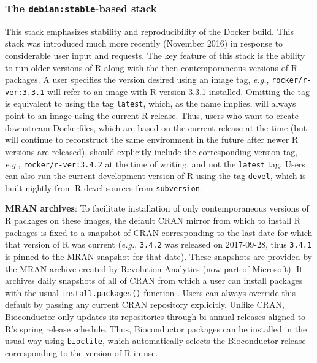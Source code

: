 \subsubsection{\texorpdfstring{The \texttt{debian:stable}-based
stack}{The debian:stable-based stack}}\label{the-debianstable-based-stack}

This stack emphasizes stability and reproducibility of the Docker build.
This stack was introduced much more recently (November 2016) in response
to considerable user input and requests. The key feature of this stack
is the ability to run older versions of R along with the
then-contemporaneous versions of R packages. A user specifies the
version desired using an image tag, \emph{e.g.},
\texttt{rocker/r-ver:3.3.1} will refer to an image with R version 3.3.1
installed. Omitting the tag is equivalent to using the tag
\texttt{latest}, which, as the name implies, will always point to an
image using the current R release. Thus, users who want to create
downstream Dockerfiles, which are based on the current release at the
time (but will continue to reconstruct the same environment in the
future after newer R versions are released), should explicitly include
the corresponding version tag, \emph{e.g.}, \texttt{rocker/r-ver:3.4.2}
at the time of writing, and not the \texttt{latest} tag. Users can also
run the current development version of R using the tag \texttt{devel},
which is built nightly from R-devel sources from \texttt{subversion}.

\textbf{MRAN archives}: To facilitate installation of only
contemporaneous versions of R packages on these images, the default CRAN
mirror from which to install R packages is fixed to a snapshot of CRAN
corresponding to the last date for which that version of R was current
(\emph{e.g.}, \texttt{3.4.2} was released on 2017-09-28, thus
\texttt{3.4.1} is pinned to the MRAN snapshot for that date). These
snapshots are provided by the MRAN archive created by Revolution
Analytics (now part of Microsoft). It archives daily snapshots of all of
CRAN from which a user can install packages with the usual
\texttt{install.packages()} function \citep{MRAN}. Users can always
override this default by passing any current CRAN repository explicitly.
Unlike CRAN, Bioconductor only updates its repositories through
bi-annual releases aligned to R's spring release schedule. Thus,
Bioconductor packages can be installed in the usual way using
\texttt{bioclite}, which automatically selects the Bioconductor release
corresponding to the version of R in use.

